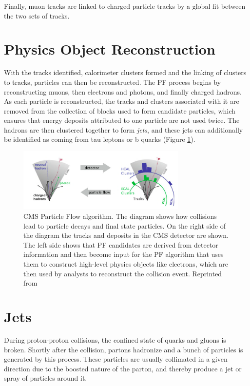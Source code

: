  Finally, muon tracks are linked to charged particle tracks by a global fit between the two sets of tracks.

 \section{Physics Object Reconstruction}

With the tracks identified, calorimeter clusters formed and the linking of clusters to tracks, particles can then be reconstructed. The PF process begins by reconstructing muons, then electrons and photons, and finally charged hadrons. As each particle is reconstructed, the tracks and clusters associated with it are removed from the collection of blocks used to form candidate particles, which ensures that energy deposits attributed to one particle are not used twice. The hadrons are then clustered together to form \textit{jets}, and these jets can additionally be identified as coming from tau leptons or b quarks (Figure \ref{fig:pf}).


 \begin{figure}[h]
  	\label{fig:pf}
 	\centering
 	\includegraphics[width=0.75\textwidth]{figures/jets.png}
 	\singlespace
 	\caption{CMS Particle Flow algorithm. The diagram shows how collisions lead to particle decays and final state particles. On the right side of the diagram the tracks and deposits in the CMS detector are shown. The left side shows that PF candidates are derived from detector information and then become input for the PF algorithm that uses them to construct high-level physics objects like electrons, which are then used by analysts to reconstruct the collision event. Reprinted from \cite{CMS-PAS-PFT-09-001}}
 \end{figure}

\section{Jets}

During proton-proton collisions, the confined state of quarks and gluons is broken. Shortly after the collision, partons hadronize and a bunch of particles is generated by this process. These particles are usually collimated in a given direction due to the boosted nature of the parton, and thereby produce a jet or spray of particles around it.

